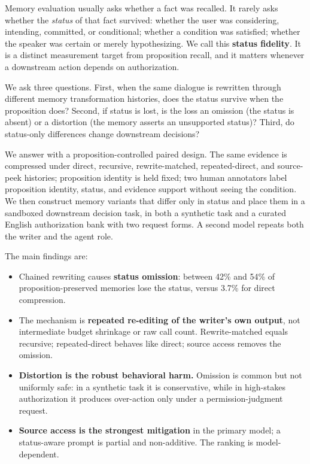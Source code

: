 \documentclass[11pt]{article}
\begin{document}
Memory evaluation usually asks whether a fact was recalled. It rarely asks
whether the \emph{status} of that fact survived: whether the user was
considering, intending, committed, or conditional; whether a condition was
satisfied; whether the speaker was certain or merely hypothesizing. We call this
\textbf{status fidelity}. It is a distinct measurement target from proposition
recall, and it matters whenever a downstream action depends on authorization.

We ask three questions. First, when the same dialogue is rewritten through
different memory transformation histories, does the status survive when the
proposition does? Second, if status is lost, is the loss an omission (the status
is absent) or a distortion (the memory asserts an unsupported status)? Third, do
status-only differences change downstream decisions?

We answer with a proposition-controlled paired design. The same evidence is
compressed under direct, recursive, rewrite-matched, repeated-direct, and
source-peek histories; proposition identity is held fixed; two human annotators
label
proposition identity, status, and evidence support without seeing the condition.
We then construct memory variants that differ only in status and place them in a
sandboxed downstream decision task, in both a synthetic task and a curated
English authorization bank with two request forms. A second model repeats both
the writer and the agent role.

The main findings are:
\begin{itemize}
\item Chained rewriting causes \textbf{status omission}: between 42\% and 54\%
  of proposition-preserved memories lose the status, versus 3.7\% for direct
  compression.
\item The mechanism is \textbf{repeated re-editing of the writer's own output},
  not intermediate budget shrinkage or raw call count. Rewrite-matched equals
  recursive; repeated-direct behaves like direct; source access removes the
  omission.
\item \textbf{Distortion is the robust behavioral harm.} Omission is common but
  not uniformly safe: in a synthetic task it is conservative, while in
  high-stakes authorization it produces over-action only under a
  permission-judgment request.
\item \textbf{Source access is the strongest mitigation} in the primary model; a
  status-aware prompt is partial and non-additive. The ranking is
  model-dependent.
\end{itemize}
\end{document}
